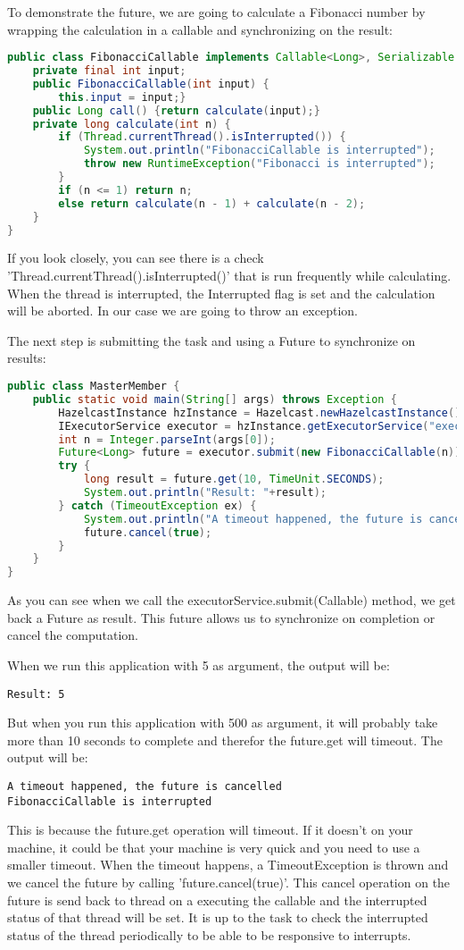 To demonstrate the future, we are going to calculate a Fibonacci number by wrapping the calculation in a callable and synchronizing on the result:
\begin{lstlisting}[language=java]
public class FibonacciCallable implements Callable<Long>, Serializable {
    private final int input;
    public FibonacciCallable(int input) {
        this.input = input;}
    public Long call() {return calculate(input);}
    private long calculate(int n) {
        if (Thread.currentThread().isInterrupted()) {
            System.out.println("FibonacciCallable is interrupted");
            throw new RuntimeException("Fibonacci is interrupted");
        }
        if (n <= 1) return n;
        else return calculate(n - 1) + calculate(n - 2);
    }
}
\end{lstlisting}
If you look closely, you can see there is a check 'Thread.currentThread().isInterrupted()' that is run frequently while calculating. When the thread is interrupted, the Interrupted flag is set and the calculation will be aborted. In our case we are going to throw an exception.

The next step is submitting the task and using a Future to synchronize on results:
\begin{lstlisting}[language=java]
public class MasterMember {
    public static void main(String[] args) throws Exception {
        HazelcastInstance hzInstance = Hazelcast.newHazelcastInstance();
        IExecutorService executor = hzInstance.getExecutorService("executor");
        int n = Integer.parseInt(args[0]);
        Future<Long> future = executor.submit(new FibonacciCallable(n));
        try {
            long result = future.get(10, TimeUnit.SECONDS);
            System.out.println("Result: "+result);
        } catch (TimeoutException ex) {
            System.out.println("A timeout happened, the future is cancelled");
            future.cancel(true);
        }
    }
}
\end{lstlisting}
As you can see when we call the executorService.submit(Callable) method, we get back a Future as result. This future allows us to synchronize on completion or cancel the computation. 

When we run this application with 5 as argument, the output will be: 
\begin{lstlisting}
Result: 5
\end{lstlisting}
But when you run this application with 500 as argument, it will probably take more than 10 seconds to complete and therefor the future.get will timeout. The output will be:
\begin{lstlisting}
A timeout happened, the future is cancelled
FibonacciCallable is interrupted
\end{lstlisting}
This is because the future.get operation will timeout. If it doesn't on your machine, it could be that your machine is very quick and you need to use a smaller timeout. When the timeout happens, a TimeoutException is thrown and we cancel the future by calling 'future.cancel(true)'. This cancel operation on the future is send back to thread on a executing the callable and the interrupted status of that thread will be set. It is up to the task to check the interrupted status of the thread periodically to be able to be responsive to interrupts.

